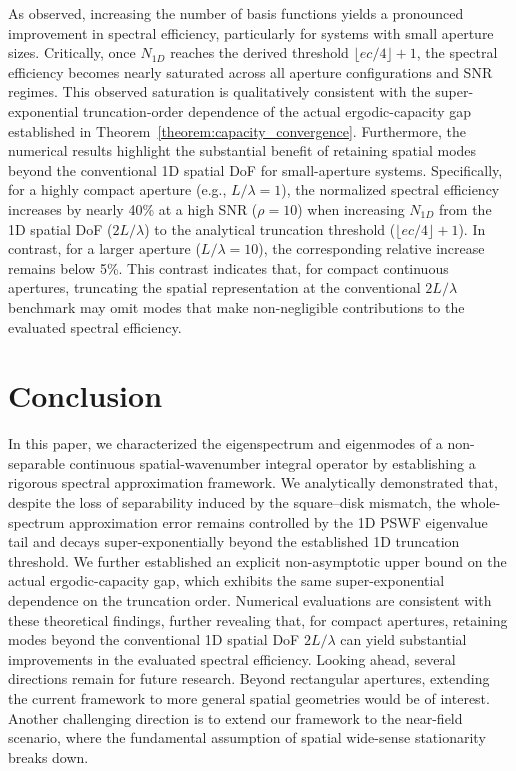 \documentclass[lettersize,journal]{IEEEtran}
\theoremstyle{plain}
\begin{document}
As observed, increasing the number of basis functions yields a pronounced improvement in spectral efficiency, particularly for systems with small aperture sizes. Critically, once $N_{1D}$ reaches the derived threshold $\lfloor ec/4 \rfloor + 1$, the spectral efficiency becomes nearly saturated across all aperture configurations and SNR regimes.
This observed saturation is qualitatively consistent with the super-exponential truncation-order dependence of the actual ergodic-capacity gap established in Theorem~\ref{theorem:capacity_convergence}.
Furthermore, the numerical results highlight the substantial benefit of retaining spatial modes beyond the conventional 1D spatial DoF for small-aperture systems.
Specifically, for a highly compact aperture (e.g., $L/\lambda = 1$), the normalized spectral efficiency increases by nearly 40\% at a high SNR ($\rho = 10$) when increasing $N_{1D}$ from the 1D spatial DoF ($2L/\lambda$) to the analytical truncation threshold ($\lfloor ec/4 \rfloor + 1$). 
In contrast, for a larger aperture ($L/\lambda = 10$), the corresponding relative increase remains below 5\%. 
This contrast indicates that, for compact continuous apertures, truncating the spatial representation at the conventional $2L/\lambda$ benchmark may omit modes that make non-negligible contributions to the evaluated spectral efficiency.
	
	
\section{Conclusion}
\label{sec:conclusion}
In this paper, we characterized the eigenspectrum and eigenmodes of a non-separable continuous spatial-wavenumber integral operator by establishing a rigorous spectral approximation framework. 
We analytically demonstrated that, despite the loss of separability induced by the square--disk mismatch, the whole-spectrum approximation error remains controlled by the 1D PSWF eigenvalue tail and decays super-exponentially beyond the established 1D truncation threshold.
We further established an explicit non-asymptotic upper bound on the actual ergodic-capacity gap, which exhibits the same super-exponential dependence on the truncation order.
Numerical evaluations are consistent with these theoretical findings, further revealing that, for compact apertures, retaining modes beyond the conventional 1D spatial DoF $2L/\lambda$ can yield substantial improvements in the evaluated spectral efficiency.
Looking ahead, several directions remain for future research. Beyond rectangular apertures, extending the current framework to more general spatial geometries would be of interest.
Another challenging direction is to extend our framework to the near-field scenario, where the fundamental assumption of spatial wide-sense stationarity breaks down.
	
\end{document}
